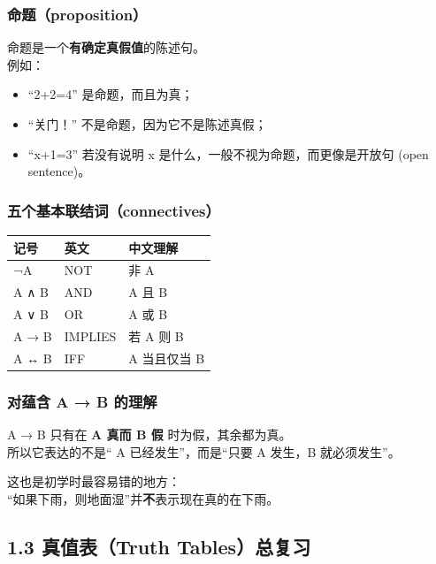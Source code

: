 \documentclass[
  11pt,
]{article}
\providecommand{\tightlist}{%
  \setlength{\itemsep}{0pt}\setlength{\parskip}{0pt}}
\begin{document}
\subsubsection{命题（proposition）}\label{ux547dux9898proposition}

命题是一个\textbf{有确定真假值}的陈述句。\\
例如：

\begin{itemize}
\tightlist
\item
  ``2+2=4'' 是命题，而且为真；
\item
  ``关门！'' 不是命题，因为它不是陈述真假；
\item
  ``x+1=3'' 若没有说明 x 是什么，一般不视为命题，而更像是开放句 (open
  sentence)。
\end{itemize}

\subsubsection{五个基本联结词（connectives）}\label{ux4e94ux4e2aux57faux672cux8054ux7ed3ux8bcdconnectives}

\begin{longtable}[]{@{}lll@{}}
\toprule\noalign{}
记号 & 英文 & 中文理解 \\
\midrule\noalign{}
\endhead
\bottomrule\noalign{}
\endlastfoot
¬A & NOT & 非 A \\
A ∧ B & AND & A 且 B \\
A ∨ B & OR & A 或 B \\
A → B & IMPLIES & 若 A 则 B \\
A ↔ B & IFF & A 当且仅当 B \\
\end{longtable}

\subsubsection{对蕴含 A → B
的理解}\label{ux5bf9ux8574ux542b-a-b-ux7684ux7406ux89e3}

A → B 只有在 \textbf{A 真而 B 假} 时为假，其余都为真。\\
所以它表达的不是`` A 已经发生''，而是``只要 A 发生，B 就必须发生''。

这也是初学时最容易错的地方：\\
``如果下雨，则地面湿''并\textbf{不}表示现在真的在下雨。

\subsection{1.3 真值表（Truth
Tables）总复习}\label{ux771fux503cux8868truth-tablesux603bux590dux4e60}
\end{document}
